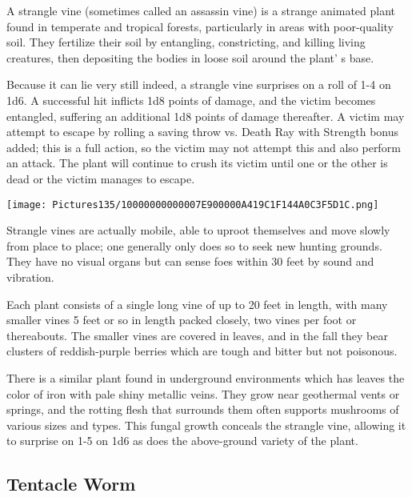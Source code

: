 \documentclass[a4paper,twoside,openany,10pt]{book}
\begin{document}
\begin{multicols}{2}
A strangle vine (sometimes called an assassin vine) is a strange animated plant found in temperate and tropical forests, particularly in areas with poor-quality soil. They fertilize their soil by entangling, constricting, and killing living creatures, then depositing the bodies in loose soil around the plant' s base.

Because it can lie very still indeed, a strangle vine surprises on a roll of 1-4 on 1d6. A successful hit inflicts 1d8 points of damage, and the victim becomes entangled, suffering an additional 1d8 points of damage thereafter. A victim may attempt to escape by rolling a saving throw vs. Death Ray with Strength bonus added; this is a full action, so the victim may not attempt this and also perform an attack. The plant will continue to crush its victim until one or the other is dead or the victim manages to escape.


\begin{center} \texttt{[image: Pictures135/10000000000007E900000A419C1F144A0C3F5D1C.png]} \end{center}

Strangle vines are actually mobile, able to uproot themselves and move slowly from place to place; one generally only does so to seek new hunting grounds. They have no visual organs but can sense foes within 30 feet by sound and vibration.

Each plant consists of a single long vine of up to 20 feet in length, with many smaller vines 5 feet or so in length packed closely, two vines per foot or thereabouts. The smaller vines are covered in leaves, and in the fall they bear clusters of reddish-purple berries which are tough and bitter but not poisonous.

There is a similar plant found in underground environments which has leaves the color of iron with pale shiny metallic veins. They grow near geothermal vents or springs, and the rotting flesh that surrounds them often supports mushrooms of various sizes and types. This fungal growth conceals the strangle vine, allowing it to surprise on 1-5 on 1d6 as does the above-ground variety of the plant.

\subsection*{Tentacle Worm}\label{tentacle-worm}


\end{multicols}
\end{document}
